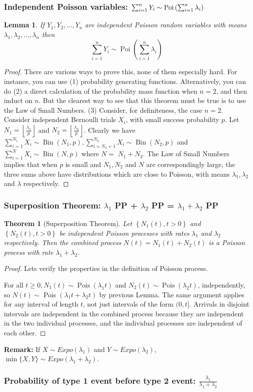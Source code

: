 \documentclass[11pt,a4paper]{article}
\newtheorem{theorem}{Theorem}
\newtheorem{lemma}{Lemma}
\begin{document}
\subsubsection{Independent Poisson variables: $\sum_{i=1}^n Y_i\sim \textnormal{Poi}\left(\sum_{i=1}^n\lambda_i\right)$}
\begin{lemma}
    If $Y_1, Y_2, \ldots, Y_n$ are independent Poisson random variables with means $\lambda_1, \lambda_2, \ldots, \lambda_n$ then
    $$
    \sum_{i=1}^n Y_i \sim \operatorname{Poi}\left(\sum_{i=1}^n \lambda_i\right)
    $$
\end{lemma}
\begin{proof}
    There are various ways to prove this, none of them especially hard. For instance, you can use (1) probability generating functions. Alternatively, you can do (2) a direct calculation of the probability mass function when $n=2$, and then induct on $n$. But the clearest way to see that this theorem must be true is to use the Law of Small Numbers. (3) Consider, for definiteness, the case $n=2$. Consider independent Bernoulli trials $X_i$, with small success probability $p$. Let $N_1=\left\lfloor\frac{\lambda_1}{p}\right\rfloor$ and $N_2=\left\lfloor\frac{\lambda_2}{p}\right\rfloor$. Clearly we have $\sum_{i=1}^{N_1} X_i \sim \operatorname{Bin}\left(N_1, p\right), \sum_{i=N_1+1}^{N_2} X_i \sim \operatorname{Bin}\left(N_2, p\right)$ and $\sum_{i=1}^N X_i \sim \operatorname{Bin}(N, p)$ where $N=$ $N_1+N_2$. The Law of Small Numbers implies that when $p$ is small and $N_1, N_2$ and $N$ are correspondingly large, the three sums above have distributions which are close to Poisson, with means $\lambda_1, \lambda_2$ and $\lambda$ respectively.
\end{proof}

\subsubsection{Superposition Theorem: $\lambda_1$ PP + $\lambda_2$ PP = $\lambda_1+\lambda_2$ PP}
\begin{theorem}[Superposition Theorem]
    Let $\left\{N_1(t), t>0\right\}$ and $\left\{N_2(t), t>0\right\}$ be independent Poisson processes with rates $\lambda_1$ and $\lambda_2$ respectively. Then the combined process $N(t)=N_1(t)+N_2(t)$ is a Poisson process with rate $\lambda_1+\lambda_2$.
\end{theorem}
\begin{proof}
    Lets verify the properties in the definition of Poisson process.
    
    For all $t \geq 0, N_1(t) \sim \operatorname{Pois}\left(\lambda_1 t\right)$ and $N_2(t) \sim \operatorname{Pois}\left(\lambda_2 t\right)$, independently, so $N(t) \sim$ Pois $\left(\lambda_1 t+\lambda_2 t\right)$ by previous Lemma. The same argument applies for any interval of length $t$, not just intervals of the form $(0, t]$. Arrivals in disjoint intervals are independent in the combined process because they are independent in the two individual processes, and the individual processes are independent of each other.
\end{proof}

\textbf{Remark:} If $X\sim Expo(\lambda_1)$ and $Y\sim Expo(\lambda_2)$, $\min\{X,Y\}\sim Expo(\lambda_1+\lambda_2)$.

\subsubsection{Probability of type 1 event before type 2 event: $\frac{\lambda_1}{\lambda_1+\lambda_2}$}
\end{document}
